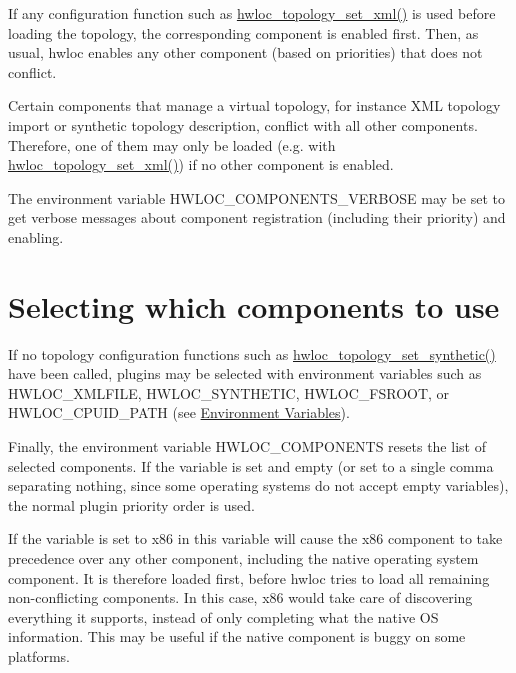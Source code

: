 If any configuration function such as \hyperlink{a00192_ga879439b7ee99407ee911b3ac64e9a25e}{hwloc\+\_\+topology\+\_\+set\+\_\+xml()} is used before loading the topology, the corresponding component is enabled first. Then, as usual, hwloc enables any other component (based on priorities) that does not conflict.

Certain components that manage a virtual topology, for instance X\+ML topology import or synthetic topology description, conflict with all other components. Therefore, one of them may only be loaded (e.\+g. with {\ttfamily \hyperlink{a00192_ga879439b7ee99407ee911b3ac64e9a25e}{hwloc\+\_\+topology\+\_\+set\+\_\+xml()}}) if no other component is enabled.

The environment variable {\ttfamily H\+W\+L\+O\+C\+\_\+\+C\+O\+M\+P\+O\+N\+E\+N\+T\+S\+\_\+\+V\+E\+R\+B\+O\+SE} may be set to get verbose messages about component registration (including their priority) and enabling.

 \hypertarget{a00392_plugins_select}{}\section{Selecting which components to use}\label{a00392_plugins_select}
If no topology configuration functions such as {\ttfamily \hyperlink{a00192_ga4fab186bb6181a00bcf585825fddd38d}{hwloc\+\_\+topology\+\_\+set\+\_\+synthetic()}} have been called, plugins may be selected with environment variables such as {\ttfamily H\+W\+L\+O\+C\+\_\+\+X\+M\+L\+F\+I\+LE}, {\ttfamily H\+W\+L\+O\+C\+\_\+\+S\+Y\+N\+T\+H\+E\+T\+IC}, {\ttfamily H\+W\+L\+O\+C\+\_\+\+F\+S\+R\+O\+OT}, or {\ttfamily H\+W\+L\+O\+C\+\_\+\+C\+P\+U\+I\+D\+\_\+\+P\+A\+TH} (see \hyperlink{a00382}{Environment Variables}).

Finally, the environment variable {\ttfamily H\+W\+L\+O\+C\+\_\+\+C\+O\+M\+P\+O\+N\+E\+N\+TS} resets the list of selected components. If the variable is set and empty (or set to a single comma separating nothing, since some operating systems do not accept empty variables), the normal plugin priority order is used.

If the variable is set to {\ttfamily x86} in this variable will cause the {\ttfamily x86} component to take precedence over any other component, including the native operating system component. It is therefore loaded first, before hwloc tries to load all remaining non-\/conflicting components. In this case, {\ttfamily x86} would take care of discovering everything it supports, instead of only completing what the native OS information. This may be useful if the native component is buggy on some platforms.

